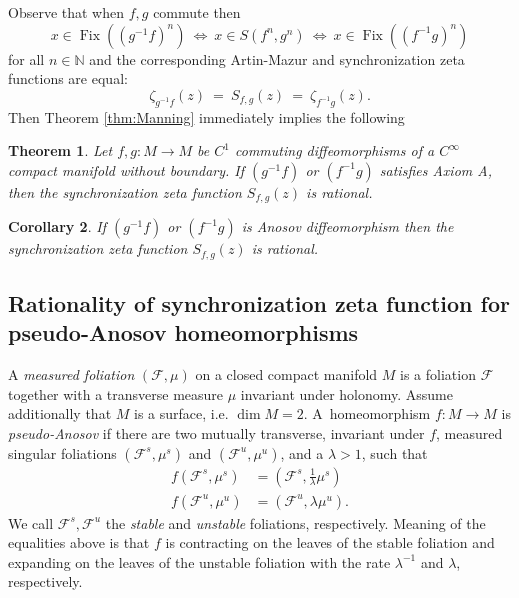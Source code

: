 \documentclass[oneside]{amsart}
\def\N{\mathbb{N}}
\def\Fix{\operatorname{Fix}}
\newtheorem{thm}{Theorem}
\newtheorem{col}[thm]{Corollary}
\begin{document}
Observe that when $f, g$ commute then
\begin{equation*}
  x \in \Fix \left( (g^{-1}f)^n \right) \ \Leftrightarrow \ x \in S(f^n, g^n) \ \Leftrightarrow \
    x \in \Fix \left( (f^{-1}g)^n \right)
\end{equation*}
for all $n \in \N$
and the corresponding Artin-Mazur and synchronization zeta functions are equal:
\begin{equation*}
  \zeta_{g^{-1}f}(z) \ = \ S_{f,g}(z) \ = \ \zeta_{f^{-1}g}(z).
\end{equation*}
Then Theorem \ref{thm:Manning} immediately implies the following
\begin{thm} \label{thm:Manning2}
  Let $f,g: M \to M$ be $C^1$
  commuting diffeomorphisms of a $C^\infty$ compact manifold without boundary.
  If $(g^{-1}f)$ or $(f^{-1}g)$ satisfies Axiom A, then the synchronization zeta function
  $S_{f,g}(z)$ is rational.
\end{thm}

\begin{col}
  If $(g^{-1}f)$ or $(f^{-1}g)$ is Anosov diffeomorphism then the synchronization zeta function
  $S_{f,g}(z)$ is rational.
\end{col}



\subsection{Rationality of synchronization zeta function for pseudo-Anosov homeomorphisms}

A \emph{measured foliation} $(\mathcal{F}, \mu)$ on a closed compact manifold $M$
is a foliation $\mathcal{F}$ together with a transverse measure $\mu$ invariant under holonomy.
Assume additionally that $M$ is a surface, i.e. $\dim M = 2$.
A~homeomorphism $f: M \to M$ is \emph{pseudo-Anosov} if there are two
mutually transverse, invariant under $f$, measured singular foliations $(\mathcal{F}^s, \mu^s)$
and $(\mathcal{F}^u, \mu^u)$, and a $\lambda > 1$, such that
\begin{align*}
  f(\mathcal{F}^s, \mu^s) &= (\mathcal{F}^s, \frac{1}{\lambda}\mu^s) \\
  f(\mathcal{F}^u, \mu^u) &= (\mathcal{F}^u, \lambda \mu^u).
\end{align*}
We call $\mathcal{F}^s, \mathcal{F}^u$ the \emph{stable} and \emph{unstable} foliations, respectively.
Meaning of the equalities above is that $f$ is contracting on the leaves of the stable foliation
and expanding on the leaves of the unstable foliation with the rate $\lambda^{-1}$ and $\lambda$, respectively.
\end{document}
